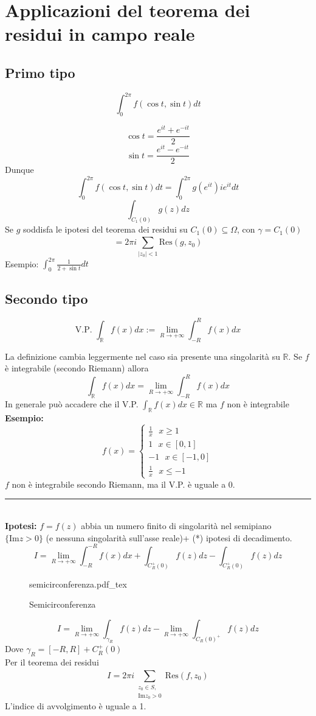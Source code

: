 \documentclass[a4paper]{article}
\newcommand{\incfig}[1]{%
	\def\svgwidth{\columnwidth}
	{#1.pdf_tex}
}
\newcommand{\R}{\mathbb{R}}
\newcommand{\divider}{\noindent\rule{\textwidth}{0.5pt}}
\begin{document}
\section{Applicazioni del teorema dei residui in campo reale}
\subsection{Primo tipo}
\begin{tcolorbox}
\[\int_{0}^{2\pi} f(\cos t, \sin t)dt\]
\end{tcolorbox}
\[\cos t = \frac{e^{it}+e^{-it}}{2}\]
\[\sin t = \frac{e^{it}-e^{-it}}{2}\]
Dunque 
\[\int_{0}^{2\pi} f(\cos t, \sin t)dt=\int_{0}^{2\pi} g(e^{it})ie^{it}dt \]
\[\int_{C_1(0)}^{} g(z)dz\]
Se $g$ soddisfa le ipotesi del teorema dei residui su $C_1(0) \subseteq  \Omega$, con $\gamma=C_1(0)$
\[=2\pi i \sum_{|z_0|<1}^{} \text{Res}(g,z_0)\]
Esempio: $\int_{0}^{2\pi} \frac{1}{2+\sin t}dt$
\subsection{Secondo tipo}
\begin{tcolorbox}	
	\[\text{V.P.  }\int_{\R}^{} f(x)dx:= \lim_{R \to +\infty} \int_{-R}^{R} f(x)dx \] 
\end{tcolorbox}
La definizione cambia leggermente nel caso sia presente una singolarità su $\R$.
Se $f$ è integrabile (secondo Riemann) allora 
\[\int_{\R}^{} f(x)dx=\lim_{R \to +\infty} \int_{-R}^{R} f(x)dx\]
In generale può accadere che il V.P. $\int_{\R}^{} f(x)dx \in\R$ ma $f$ non è integrabile
\textbf{Esempio:} 
\[f(x)=\begin{cases}
	\frac{1}{x}\ \ \ x\ge 1\\
	1\ \ \ x\in[0,1]\\
	-1\ \ \ x\in[-1,0]\\
	\frac{1}{x}\ \ \ x\le -1
\end{cases}
\]
$f$ non è integrabile secondo Riemann, ma il V.P. è uguale a 0.\\\divider
\\\textbf{Ipotesi: }$f=f(z)$ abbia un numero finito di singolarità nel semipiano $\{\text{Im}z>0\} $ (e nessuna singolarità sull'asse reale)+ (*) ipotesi di decadimento.
\[I=\lim_{R \to +\infty} \int_{-R}^{-R} f(x)dx+\int_{C_R^+(0)}^{} f(z)dz-\int_{C_R^+(0)}^{} f(z)dz \]
\begin{figure}[ht]
    \centering
    \incfig{semicirconferenza}
    \caption{Semicirconferenza}
    \label{fig:semicirconferenza}
\end{figure}
\[I=\lim_{R \to +\infty} \int_{\gamma_R}{f(z)dz} -\lim_{R \to +\infty} \int_{C_R(0)^+}^{} f(z)dz\]
Dove $\gamma_R=[-R,R]+C_R^+(0)$
\\Per il teorema dei residui
\[I=2\pi i \sum_{\substack{z_0\in S,\\  \text{Im}z_0>0}}^{} \text{Res}(f,z_0)\]
L'indice di avvolgimento è uguale a 1.
\end{document}
